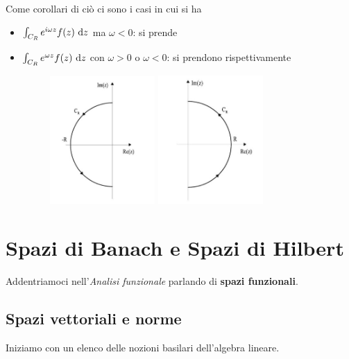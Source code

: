 Come corollari di ciò ci sono i casi in cui si ha
\begin{itemize}
    \item $\int_{C_R} e^{i\omega z}f(z)\  \mathrm{d} z$ ma $\omega<0$: si prende

    \item $\int_{C_R} e^{\omega z}f(z)\  \mathrm{d} z$ con $\omega>0$ o $\omega<0$: si prendono rispettivamente
    \begin{figure}[h!]
    \begin{center}
      \includegraphics[width=4cm]{images/bonfa_12}
      \includegraphics[width=4cm]{images/bonfa_13}
    \end{center}
    \end{figure}
\end{itemize}


\chapter{Spazi di Banach e Spazi di Hilbert}

Addentriamoci nell'\textit{Analisi funzionale} parlando di \textbf{spazi funzionali}.

\section{Spazi vettoriali e norme}

Iniziamo con un elenco delle nozioni basilari dell'algebra lineare.

